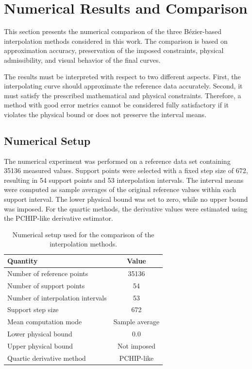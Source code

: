 \documentclass[12pt,a4paper]{article}
\begin{document}
\newpage
\section{Numerical Results and Comparison}

This section presents the numerical comparison of the three B\'ezier-based
interpolation methods considered in this work. The comparison is based on approximation accuracy, preservation
of the imposed constraints, physical admissibility, and visual behavior of the
final curves.

The results must be interpreted with respect to two different aspects. First,
the interpolating curve should approximate the reference data accurately.
Second, it must satisfy the prescribed mathematical and physical constraints.
Therefore, a method with good error metrics cannot be considered fully
satisfactory if it violates the physical bound or does not preserve the
interval means.

\subsection{Numerical Setup}

The numerical experiment was performed on a reference data set containing
35136 measured values. Support points were selected with a fixed step size of
672, resulting in 54 support points and 53 interpolation intervals. The
interval means were computed as sample averages of the original reference
values within each support interval. The lower physical bound was set to zero,
while no upper bound was imposed. For the quartic methods, the derivative
values were estimated using the PCHIP-like derivative estimator.

\begin{table}[H]
\centering
\begin{tabular}{lc}
\toprule
Quantity & Value \\
\midrule
Number of reference points & 35136 \\
Number of support points & 54 \\
Number of interpolation intervals & 53 \\
Support step size & 672 \\
Mean computation mode & Sample average \\
Lower physical bound & 0.0 \\
Upper physical bound & Not imposed \\
Quartic derivative method & PCHIP-like \\
\bottomrule
\end{tabular}
\caption{Numerical setup used for the comparison of the interpolation methods.}
\label{tab:numerical-setup}
\end{table}
\end{document}
